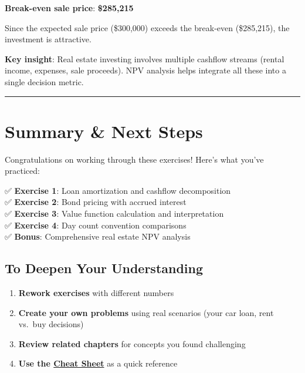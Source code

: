 \documentclass[
  letterpaper,
]{scrbook}
\providecommand{\tightlist}{%
  \setlength{\itemsep}{0pt}\setlength{\parskip}{0pt}}
\begin{document}
\begin{tcolorbox}
\textbf{Break-even sale price}: \textbf{\$285,215}

Since the expected sale price (\$300,000) exceeds the break-even
(\$285,215), the investment is attractive.

\textbf{Key insight}: Real estate investing involves multiple cashflow
streams (rental income, expenses, sale proceeds). NPV analysis helps
integrate all these into a single decision metric.

\end{tcolorbox}

\begin{center}\rule{0.5\linewidth}{0.5pt}\end{center}

\section{Summary \& Next Steps}\label{summary-next-steps}

Congratulations on working through these exercises! Here's what you've
practiced:

✅ \textbf{Exercise 1}: Loan amortization and cashflow decomposition\\
✅ \textbf{Exercise 2}: Bond pricing with accrued interest\\
✅ \textbf{Exercise 3}: Value function calculation and interpretation\\
✅ \textbf{Exercise 4}: Day count convention comparisons\\
✅ \textbf{Bonus}: Comprehensive real estate NPV analysis

\subsection{To Deepen Your
Understanding}\label{to-deepen-your-understanding}

\begin{enumerate}
\def\labelenumi{\arabic{enumi}.}
\tightlist
\item
  \textbf{Rework exercises} with different numbers
\item
  \textbf{Create your own problems} using real scenarios (your car loan,
  rent vs.~buy decisions)
\item
  \textbf{Review related chapters} for concepts you found challenging
\item
  \textbf{Use the \hyperref[cheat-sheet]{Cheat Sheet}} as a quick
  reference
\end{enumerate}
\end{document}
